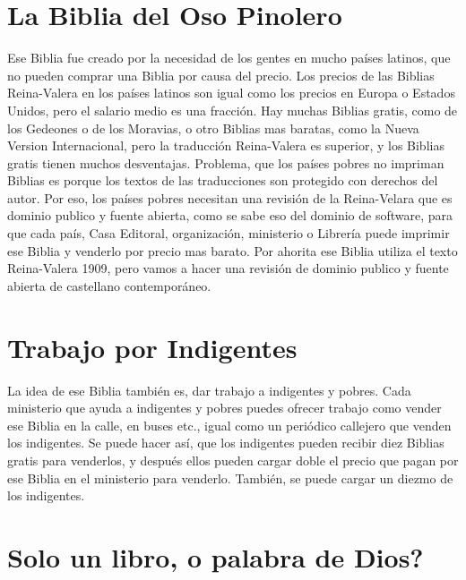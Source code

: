 \hypertarget{la-biblia-del-oso-pinolero}{%
\section{La Biblia del Oso Pinolero}\label{la-biblia-del-oso-pinolero}}

Ese Biblia fue creado por la necesidad de los gentes en mucho países
latinos, que no pueden comprar una Biblia por causa del precio. Los
precios de las Biblias Reina-Valera en los países latinos son igual como
los precios en Europa o Estados Unidos, pero el salario medio es una
fracción. Hay muchas Biblias gratis, como de los Gedeones o de los
Moravias, o otro Biblias mas baratas, como la Nueva Version
Internacional, pero la traducción Reina-Valera es superior, y los
Biblias gratis tienen muchos desventajas. Problema, que los países
pobres no impriman Biblias es porque los textos de las traducciones son
protegido con derechos del autor. Por eso, los países pobres necesitan
una revisión de la Reina-Velara que es dominio publico y fuente abierta,
como se sabe eso del dominio de software, para que cada país, Casa
Editoral, organización, ministerio o Librería puede imprimir ese Biblia
y venderlo por precio mas barato. Por ahorita ese Biblia utiliza el
texto Reina-Valera 1909, pero vamos a hacer una revisión de dominio
publico y fuente abierta de castellano contemporáneo.

\hypertarget{trabajo-por-indigentes}{%
\section{Trabajo por Indigentes}\label{trabajo-por-indigentes}}

La idea de ese Biblia también es, dar trabajo a indigentes y pobres.
Cada ministerio que ayuda a indigentes y pobres puedes ofrecer trabajo
como vender ese Biblia en la calle, en buses etc., igual como un
periódico callejero que venden los indigentes. Se puede hacer así, que
los indigentes pueden recibir diez Biblias gratis para venderlos, y
después ellos pueden cargar doble el precio que pagan por ese Biblia en
el ministerio para venderlo. También, se puede cargar un diezmo de los
indigentes.

\hypertarget{solo-un-libro-o-palabra-de-dios}{%
\section{Solo un libro, o palabra de
Dios?}\label{solo-un-libro-o-palabra-de-dios}}

